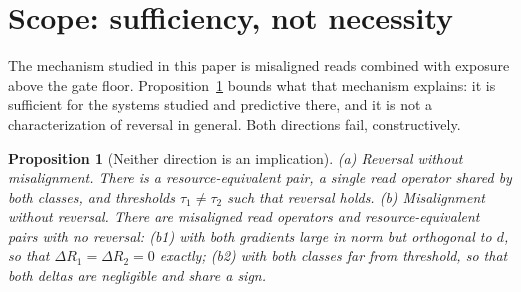 \documentclass[11pt]{article}
\newtheorem{proposition}{Proposition}
\theoremstyle{definition}
\theoremstyle{remark}
\begin{document}
\section{Scope: sufficiency, not necessity}\label{sec:scope}

The mechanism studied in this paper is misaligned reads combined with
exposure above the gate floor. Proposition~\ref{prop:scope} bounds what that
mechanism explains: it is sufficient for the systems studied and predictive
there, and it is not a characterization of reversal in general. Both
directions fail, constructively.

\begin{proposition}[Neither direction is an implication]\label{prop:scope}
\emph{(a) Reversal without misalignment.} There is a resource-equivalent
pair, a single read operator shared by both classes, and thresholds
$\tau_1 \ne \tau_2$ such that reversal holds.
\emph{(b) Misalignment without reversal.} There are misaligned read
operators and resource-equivalent pairs with no reversal: (b1) with both
gradients large in norm but orthogonal to $d$, so that $\Delta R_1 = \Delta
R_2 = 0$ exactly; (b2) with both classes far from threshold, so that both
deltas are negligible and share a sign.
\end{proposition}
\end{document}
